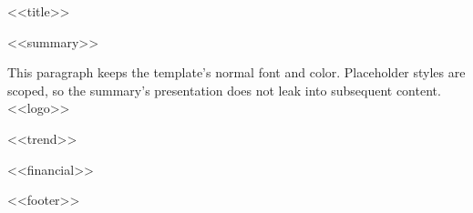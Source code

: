 \documentclass[11pt]{article}
\begin{document}
<<title>>\par
<<summary>>\par
This paragraph keeps the template's normal font and color. Placeholder styles
are scoped, so the summary's presentation does not leak into subsequent content.
<<logo>>\par
<<trend>>\par
<<financial>>\par
<<footer>>\par
\end{document}
